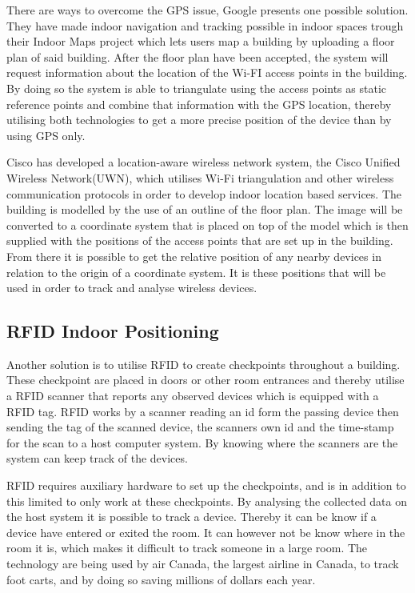 There are ways to overcome the GPS issue, Google presents one possible solution. They have made indoor navigation and tracking possible in indoor spaces trough their Indoor Maps project \cite{IPSoverGPS} which lets users map a building by uploading a floor plan of said building. After the floor plan have been accepted, the system will request information about the location of the Wi-FI access points in the building. By doing so the system is able to triangulate using the access points as static reference points and combine that information with the GPS location, thereby utilising both technologies to get a more precise position of the device than by using GPS only.

Cisco has developed a location-aware wireless network system, the Cisco Unified Wireless Network(UWN), which utilises Wi-Fi triangulation\cite{CiscoTri} and other wireless communication protocols in order to develop indoor location based services\cite{uwn}. 
The building is modelled by the use of an outline of the floor plan. The image will be converted to a coordinate system that is placed on top of the model which is then supplied with the positions of the access points that are set up in the building. From there it is possible to get the relative position of any nearby devices in relation to the origin of a coordinate system. It is these positions that will be used in order to track and analyse wireless devices.

\subsection{RFID Indoor Positioning}
Another solution is to utilise RFID to create checkpoints throughout a building. These checkpoint are placed in doors or other room entrances and thereby utilise a RFID scanner that reports any observed devices which is equipped with a RFID tag\cite{indoor_bin}. 
RFID works by a scanner reading an id form the passing device then sending the tag of the scanned device, the scanners own id and the time-stamp for the scan to a host computer system. By knowing where the scanners are the system can keep track of the devices\cite{RFIDjournal}.

RFID requires auxiliary hardware to set up the checkpoints, and is in addition to this limited to only work at these checkpoints. By analysing the collected data on the host system it is possible to track a device. Thereby it can be know if a device have entered or exited the room. It can however not be know where in the room it is, which makes it difficult to track someone in a large room.
The technology are being used by air Canada, the largest airline in Canada, to track foot carts, and by doing so saving millions of dollars each year\cite{RFIDjournal}.


